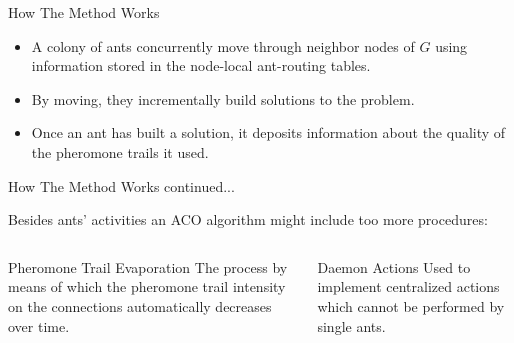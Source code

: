 \documentclass[table]{beamer}
\begin{document}
\begin{frame}{How The Method Works}
	\begin{itemize}
		\item<1-> A colony of ants concurrently move through neighbor nodes of $G$
		using information stored in the node-local ant-routing tables. 
		
		\item<2-> By moving, they incrementally build solutions to the problem.
		
		\item<3-> Once an ant has built a solution, it deposits information about 	the quality of the pheromone trails it used.
		
	\end{itemize}
\end{frame}

\begin{frame}{How The Method Works continued...}
	
		Besides ants' activities an ACO algorithm might include too more procedures:
		\newline
	
	\begin{columns}
			\begin{block}{Pheromone Trail Evaporation}
				The process by means of which the pheromone trail intensity on the connections automatically decreases over time.
			\end{block}
			\begin{block}{Daemon Actions}
				Used to implement centralized actions which cannot be performed by single ants.\newline
				
			\end{block}	
	\end{columns}
	
\end{frame}
\end{document}
